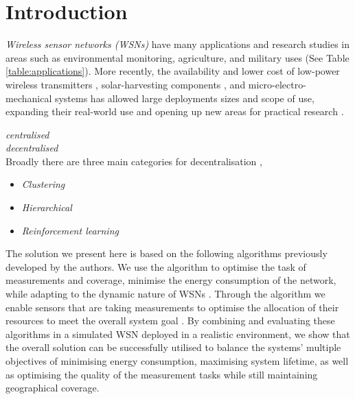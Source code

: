 \section{Introduction}

\textit{Wireless sensor networks (WSNs)} have many applications and research studies in areas such as environmental monitoring, agriculture, and military uses (See Table \ref{table:applications}). More recently, the availability and lower cost of low-power wireless transmitters \citep{902661}, solar-harvesting components \citep{Prauzek2018}, and micro-electro-mechanical systems \citep{1045391} has allowed large deployments sizes and scope of use, expanding their real-world use and opening up new areas for practical research \citep{5597912, Kandris2020}.

\textit{centralised}\\
\textit{decentralised}\\
Broadly there are three main categories for decentralisation \citep{10.1007/978-3-642-11814-2_4, 10.1504/IJCNDS.2012.048871},
\begin{itemize}
	\item \textit{Clustering}
	\item \textit{Hierarchical}
	\item \textit{Reinforcement learning}
\end{itemize}

The solution we present here is based on the following algorithms previously developed by the authors. We use the \acronymATARIA{}{} algorithm to optimise the task of measurements and coverage, minimise the energy consumption of the network, while adapting to the dynamic nature of WSNs \citep{creech2021dynamic}. Through the \acronymMGRAO{}{} algorithm we enable sensors that are taking measurements to optimise the allocation of their resources to meet the overall system goal \citep{creech2021resource}. By combining and evaluating these algorithms in a simulated WSN deployed in a realistic environment, we show that the overall solution can be successfully utilised to balance the systems' multiple objectives of minimising energy consumption, maximising system lifetime, as well as optimising the quality of the measurement tasks while still maintaining geographical coverage.

